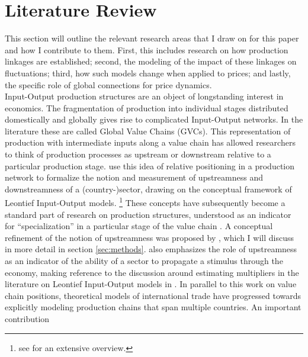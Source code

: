\section{Literature Review}
\label{sec:lit}

This section will outline the relevant research areas that I draw on for this paper and how I contribute to them. First, this includes 
research on how production linkages are established; second, the modeling of the impact of these linkages on fluctuations; third, how 
such models change when applied to prices; and lastly, the specific role of global connections for price dynamics.\\

Input-Output production structures are an object of longstanding interest in economics. The fragmentation of production into individual 
stages distributed domestically and globally gives rise to complicated Input-Output networks. In the literature these are called Global 
Value Chains (GVCs). This representation of production with intermediate inputs along a value chain has allowed researchers to think of 
production processes as upstream or downstream relative to a particular production stage. \textcite{antras2012MeasuringUpstreamnessProduction} 
use this idea of relative positioning in a production network to formalize the notion and measurement of upstreamness and downstreamness of a 
(country-)sector, drawing on the conceptual framework of Leontief Input-Output models. \footnote{see 
\textcite{miller2009InputoutputAnalysisFoundations} for an extensive overview.}  These concepts have subsequently become a standard part of 
research on production structures, understood as an indicator for ``specialization'' in a particular stage of the value chain 
\parencite{wang2017MeasuresParticipationGlobal,alfaro2019InternalizingGlobalValue}. A conceptual refinement of the notion of upstreamness 
was proposed by \textcite{miller2017OutputUpstreamnessInput}, which I will discuss in more detail in section \ref{sec:methods}. 
\textcite{miller2017OutputUpstreamnessInput} also emphasizes the role of upstreamness as an indicator of the ability of a sector to propagate 
a stimulus through the economy, making reference to the discussion around estimating multipliers in the literature on Leontief Input-Output 
models in \textcite[243-250]{miller2009InputoutputAnalysisFoundations}. In parallel to this work on value chain positions, theoretical models 
of international trade have progressed towards explicitly modeling production chains that span multiple countries. An important contribution 
